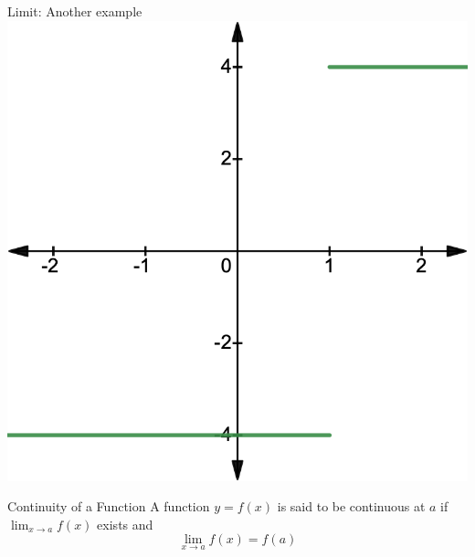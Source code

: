 \documentclass{./../../Latex/teaching_slides}
\begin{document}
\begin{frame}{Limit: Another example}
\vspace{1em}
\centering
\includegraphics[scale=0.225]{lim2.png}
\end{frame}


\begin{frame}{Continuity of a Function}
A function $y=f(x)$ is said to be continuous at $a$ if $\lim _{x \rightarrow a} f(x)$ exists and $$\lim _{x \rightarrow a} f(x) = f(a)$$

\end{frame}
\end{document}
